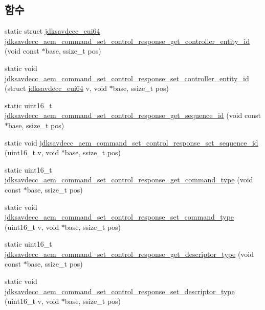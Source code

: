 \subsection*{함수}
\begin{DoxyCompactItemize}
\item 
static struct \hyperlink{structjdksavdecc__eui64}{jdksavdecc\+\_\+eui64} \hyperlink{group__command__set__control__response_gafc25171e0502e50f969dffb836cb1c07}{jdksavdecc\+\_\+aem\+\_\+command\+\_\+set\+\_\+control\+\_\+response\+\_\+get\+\_\+controller\+\_\+entity\+\_\+id} (void const $\ast$base, ssize\+\_\+t pos)
\item 
static void \hyperlink{group__command__set__control__response_gaebe6a298933f540b3b512b8167ab1615}{jdksavdecc\+\_\+aem\+\_\+command\+\_\+set\+\_\+control\+\_\+response\+\_\+set\+\_\+controller\+\_\+entity\+\_\+id} (struct \hyperlink{structjdksavdecc__eui64}{jdksavdecc\+\_\+eui64} v, void $\ast$base, ssize\+\_\+t pos)
\item 
static uint16\+\_\+t \hyperlink{group__command__set__control__response_gacb55c052a5b9df449ad488528685ae83}{jdksavdecc\+\_\+aem\+\_\+command\+\_\+set\+\_\+control\+\_\+response\+\_\+get\+\_\+sequence\+\_\+id} (void const $\ast$base, ssize\+\_\+t pos)
\item 
static void \hyperlink{group__command__set__control__response_ga31f3082db4572b5967b6ece7f71e2da0}{jdksavdecc\+\_\+aem\+\_\+command\+\_\+set\+\_\+control\+\_\+response\+\_\+set\+\_\+sequence\+\_\+id} (uint16\+\_\+t v, void $\ast$base, ssize\+\_\+t pos)
\item 
static uint16\+\_\+t \hyperlink{group__command__set__control__response_ga8a62bf56653149c66af54f00939e3d3f}{jdksavdecc\+\_\+aem\+\_\+command\+\_\+set\+\_\+control\+\_\+response\+\_\+get\+\_\+command\+\_\+type} (void const $\ast$base, ssize\+\_\+t pos)
\item 
static void \hyperlink{group__command__set__control__response_gafa4142c62d9c666db6fcf9158b93dfa2}{jdksavdecc\+\_\+aem\+\_\+command\+\_\+set\+\_\+control\+\_\+response\+\_\+set\+\_\+command\+\_\+type} (uint16\+\_\+t v, void $\ast$base, ssize\+\_\+t pos)
\item 
static uint16\+\_\+t \hyperlink{group__command__set__control__response_ga3044a1ed72f250a4a37562aa72680210}{jdksavdecc\+\_\+aem\+\_\+command\+\_\+set\+\_\+control\+\_\+response\+\_\+get\+\_\+descriptor\+\_\+type} (void const $\ast$base, ssize\+\_\+t pos)
\item 
static void \hyperlink{group__command__set__control__response_gad37d1553ecbcbdbf923b22848d4ea192}{jdksavdecc\+\_\+aem\+\_\+command\+\_\+set\+\_\+control\+\_\+response\+\_\+set\+\_\+descriptor\+\_\+type} (uint16\+\_\+t v, void $\ast$base, ssize\+\_\+t pos)

\end{DoxyCompactItemize}
